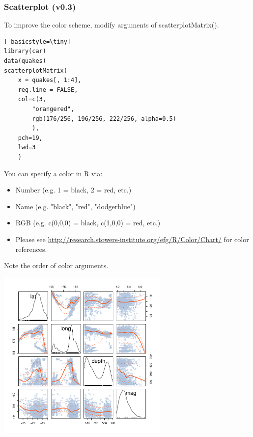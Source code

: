 \begin{frame}
\frametitle{Scatterplot (v0.3)}

To improve the color scheme, modify arguments of \ttfamily scatterplotMatrix().  
  		\begin{lstlisting}[ basicstyle=\tiny]
library(car)		
data(quakes)
scatterplotMatrix(
	x = quakes[, 1:4], 
	reg.line = FALSE,
	col=c(3,
		"orangered",
		rgb(176/256, 196/256, 222/256, alpha=0.5)
		), 
	pch=19,
	lwd=3
	)
		\end{lstlisting}
\normalfont
\framebreak
You can specify a color in R via: 
\begin{itemize}
	\item Number (e.g. 1 = black, 2 = red, etc.)
	\item Name (e.g. "black", "red", "dodgerblue")
	\item RGB (e.g. c(0,0,0) = black, c(1,0,0) = red, etc.)
	\item Please see \url{http://research.stowers-institute.org/efg/R/Color/Chart/} for color references. 
\end{itemize}

\noindent Note the order of color arguments. \normalfont
        \begin{center}
         \includegraphics[width=0.63\textwidth]{images/scatterPlot_v3.pdf}
        \end{center}
\end{frame}

